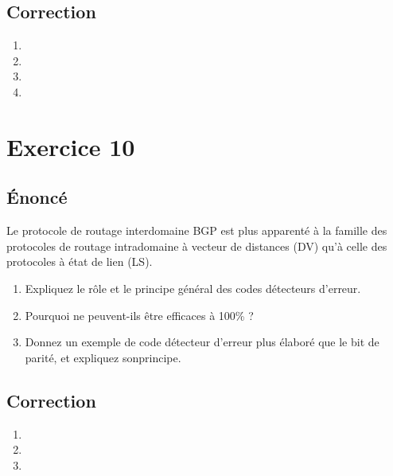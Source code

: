 \documentclass[a4paper, 11pt, titlepage]{article}
\begin{document}
\subsection{Correction}
\begin{enumerate}[label=(\alph*)]
\item 

\item

\item 

\item 

\end{enumerate}


\section{Exercice 10}
\subsection{\'Enoncé}
Le protocole de routage interdomaine BGP est plus apparenté à la famille des protocoles de routage intradomaine à vecteur de distances (DV) qu’à celle des protocoles à état de lien (LS).
\begin{enumerate}[label=(\alph*)]
  \item Expliquez le rôle et le principe général des codes détecteurs d’erreur.
  \item Pourquoi ne peuvent-ils être efficaces à 100\% ?
  \item Donnez un exemple de code détecteur d’erreur plus élaboré que le bit de parité, et expliquez sonprincipe.
\end{enumerate}

\subsection{Correction}
\begin{enumerate}[label=(\alph*)]
\item

\item

\item

\end{enumerate}
\end{document}
